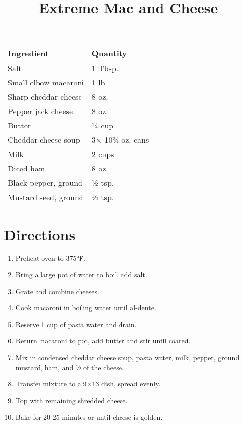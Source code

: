 \documentclass[11pt,letterpaper]{article}
\title{Extreme Mac and Cheese}
\author{}
\date{}
\begin{document}
\maketitle

\begin{table}[h]
  \centering
  \setlength{\tabcolsep}{1em}
  \renewcommand{\arraystretch}{1.6}
  \begin{tabular}{|l|l|}
    \hline
    \textbf{Ingredient} & \textbf{Quantity} \\
    \hline
    Salt & 1 Tbsp. \\
    Small elbow macaroni & 1 lb. \\
    Sharp cheddar cheese & 8 oz. \\
    Pepper jack cheese & 8 oz. \\
    Butter & ¼ cup \\
    Cheddar cheese soup & 3× 10¾ oz. cans \\
    Milk & 2 cups \\
    Diced ham & 8 oz. \\
    Black pepper, ground & ½ tsp. \\
    Mustard seed, ground & ½ tsp. \\
    \hline
  \end{tabular}
\end{table}

\section*{Directions}
\begin{enumerate}
    \item Preheat oven to 375°F.
    \item Bring a large pot of water to boil, add salt.
    \item Grate and combine cheeses.
    \item Cook macaroni in boiling water until al-dente.
    \item Reserve 1 cup of pasta water and drain.
    \item Return macaroni to pot, add butter and stir until coated.
    \item Mix in condensed cheddar cheese soup, pasta water, milk, pepper, ground mustard, ham, and ½ of the cheese.
    \item Transfer mixture to a 9×13 dish, spread evenly.
    \item Top with remaining shredded cheese.
    \item Bake for 20-25 minutes or until cheese is golden.
\end{enumerate}
\end{document}
